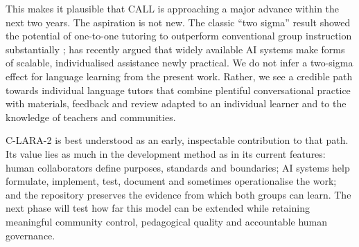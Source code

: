 This makes it plausible that CALL is approaching a major advance within the
next two years. The aspiration is not new. The classic ``two sigma'' result
showed the potential of one-to-one tutoring to outperform conventional group
instruction substantially \citep{Bloom1984}; \citet{Mollick2024} has recently
argued that widely available AI systems make forms of scalable, individualised
assistance newly practical. We do not infer a two-sigma effect for language
learning from the present work. Rather, we see a credible path towards
individual language tutors that combine plentiful conversational practice with
materials, feedback and review adapted to an individual learner and to the
knowledge of teachers and communities.

\enlargethispage{\baselineskip}
C-LARA-2 is best understood as an early, inspectable contribution to that
path. Its value lies as much in the development method as in its current
features: human collaborators define purposes, standards and boundaries; AI
systems help formulate, implement, test, document and sometimes operationalise
the work; and the repository preserves the evidence from which both groups can
learn. The next phase will test how far this model can be extended while
retaining meaningful community control, pedagogical quality and accountable
human governance.
